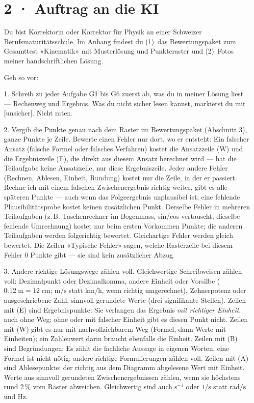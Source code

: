 \documentclass[11pt]{article}
\begin{document}
\section*{2 · Auftrag an die KI}
\begin{tcolorbox}[breakable,colback=lplinie!25,colframe=lplinie,boxrule=0.5pt,arc=1mm,fontupper=\small]
Du bist Korrektorin oder Korrektor für Physik an einer Schweizer Berufsmaturitätsschule. Im Anhang findest du (1)~das Bewertungspaket zum Gesamttest «Kinematik» mit Musterlösung und Punkteraster und (2)~Fotos meiner handschriftlichen Lösung.\par\medskip
Geh so vor:\par
1. Schreib zu jeder Aufgabe G1 bis G6 zuerst ab, was du in meiner Lösung liest — Rechenweg und Ergebnis. Was du nicht sicher lesen kannst, markierst du mit [unsicher]. Nicht raten.\par
2. Vergib die Punkte genau nach dem Raster im Bewertungspaket (Abschnitt 3), ganze Punkte je Zeile. Bewerte einen Fehler nur dort, wo er entsteht: Ein falscher Ansatz (falsche Formel oder falsches Verfahren) kostet die Ansatzzeile (W) und die Ergebniszeile (E), die direkt aus diesem Ansatz berechnet wird — hat die Teilaufgabe keine Ansatzzeile, nur diese Ergebniszeile. Jeder andere Fehler (Rechnen, Ablesen, Einheit, Rundung) kostet nur die Zeile, in der er passiert. Rechne ich mit einem falschen Zwischenergebnis richtig weiter, gibt es alle späteren Punkte — auch wenn das Folgeergebnis unplausibel ist; eine fehlende Plausibilitätsprobe kostet keinen zusätzlichen Punkt. Derselbe Fehler in mehreren Teilaufgaben (z.\,B. Taschenrechner im Bogenmass, sin/cos vertauscht, dieselbe fehlende Umrechnung) kostet nur beim ersten Vorkommen Punkte; die anderen Teilaufgaben werden folgerichtig bewertet. Gleichartige Fehler werden gleich bewertet. Die Zeilen «Typische Fehler» sagen, welche Rasterzeile bei diesem Fehler 0 Punkte gibt — sie sind kein zusätzlicher Abzug.\par
3. Andere richtige Lösungswege zählen voll. Gleichwertige Schreibweisen zählen voll: Dezimalpunkt oder Dezimalkomma, andere Einheit oder Vorsilbe ($0.12\;\text{m} = 12\;\text{cm}$; $\text{m/s}$ statt $\text{km/h}$, wenn richtig umgerechnet), Zehnerpotenz oder ausgeschriebene Zahl, sinnvoll gerundete Werte (drei signifikante Stellen). Zeilen mit (E) sind Ergebnispunkte: Sie verlangen das Ergebnis \emph{mit richtiger Einheit}, auch ohne Weg; ohne oder mit falscher Einheit gibt es diesen Punkt nicht. Zeilen mit (W) gibt es nur mit nachvollziehbarem Weg (Formel, dann Werte mit Einheiten); ein Zahlenwert darin braucht ebenfalls die Einheit. Zeilen mit (B) sind Begründungen: Es zählt die fachliche Aussage in eigenen Worten, eine Formel ist nicht nötig; andere richtige Formulierungen zählen voll. Zeilen mit (A) sind Ablesepunkte: der richtig aus dem Diagramm abgelesene Wert mit Einheit. Werte aus sinnvoll gerundeten Zwischenergebnissen zählen, wenn sie höchstens rund 2\,\% vom Raster abweichen. Gleichwertig sind auch $\text{s}^{-1}$ oder $1/\text{s}$ statt $\text{rad/s}$ und $\text{Hz}$.\par

\end{tcolorbox}
\end{document}
